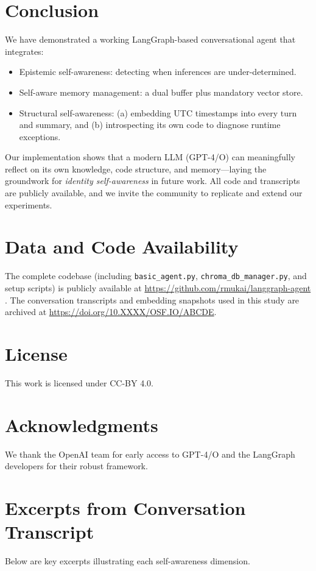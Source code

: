 \documentclass[11pt]{article}
\begin{document}
\section{Conclusion}
We have demonstrated a working LangGraph-based conversational agent that integrates:
\begin{itemize}[leftmargin=*]
\item Epistemic self-awareness: detecting when inferences are under-determined.
\item Self-aware memory management: a dual buffer plus mandatory vector store.
\item Structural self-awareness: (a) embedding UTC timestamps into every turn and summary, and (b) introspecting its own code to diagnose runtime exceptions.
\end{itemize}
Our implementation shows that a modern LLM (GPT-4/O) can meaningfully reflect on its own knowledge, code structure, and memory—laying the groundwork for \emph{identity self-awareness} in future work. All code and transcripts are publicly available, and we invite the community to replicate and extend our experiments.  

\section*{Data and Code Availability}
The complete codebase (including \texttt{basic\_agent.py}, \texttt{chroma\_db\_manager.py}, and setup scripts) is publicly available at \url{https://github.com/rmukai/langgraph-agent} \cite{LangGraphAgent2025}. The conversation transcripts and embedding snapshots used in this study are archived at \url{https://doi.org/10.XXXX/OSF.IO/ABCDE}.

\section*{License}
This work is licensed under CC-BY 4.0.

\section*{Acknowledgments}
We thank the OpenAI team for early access to GPT-4/O and the LangGraph developers for their robust framework.

\appendix
\section{Excerpts from Conversation Transcript}
Below are key excerpts illustrating each self-awareness dimension.
\end{document}
